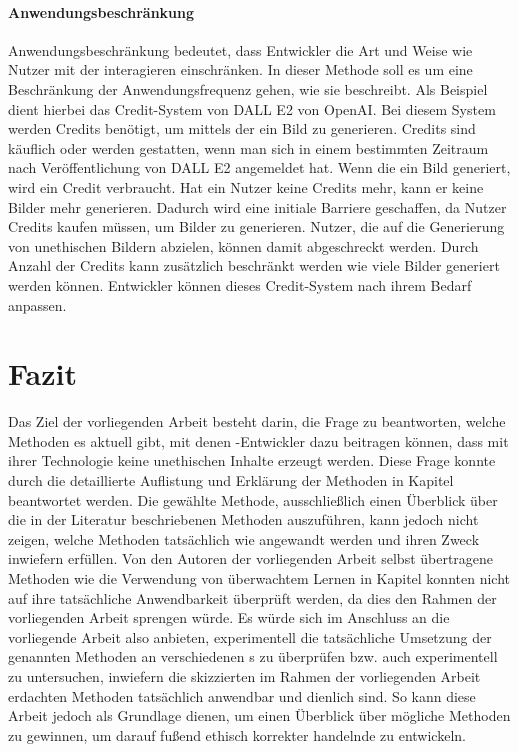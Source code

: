 \documentclass[12pt]{report}
\begin{document}
\subsubsection{Anwendungsbeschränkung} %
Anwendungsbeschränkung bedeutet, dass Entwickler die Art und Weise wie Nutzer mit der  interagieren einschränken. In dieser Methode soll es um eine Beschränkung der Anwendungsfrequenz gehen, wie sie \cite{Jang} beschreibt. Als Beispiel dient hierbei das Credit-System von DALL E2 von OpenAI. Bei diesem System werden Credits benötigt, um mittels der  ein Bild zu generieren. Credits sind käuflich oder werden gestatten, wenn man sich in einem bestimmten Zeitraum nach Veröffentlichung von DALL E2 angemeldet hat. Wenn die  ein Bild generiert, wird ein Credit verbraucht. Hat ein Nutzer keine Credits mehr, kann er keine Bilder mehr generieren. Dadurch wird eine initiale Barriere geschaffen, da Nutzer Credits kaufen müssen, um Bilder zu generieren. Nutzer, die auf die Generierung von unethischen Bildern abzielen, können damit abgeschreckt werden. Durch Anzahl der Credits kann zusätzlich beschränkt werden wie viele Bilder generiert werden können. Entwickler können dieses Credit-System nach ihrem Bedarf anpassen.


\chapter{Fazit}
Das Ziel der vorliegenden Arbeit besteht darin, die Frage zu beantworten, welche Methoden es aktuell gibt, mit denen -Entwickler dazu beitragen können, dass mit ihrer Technologie keine unethischen Inhalte erzeugt werden. Diese Frage konnte durch die detaillierte Auflistung und Erklärung der Methoden in Kapitel  beantwortet werden. Die gewählte Methode, ausschließlich einen Überblick über die in der Literatur beschriebenen Methoden auszuführen, kann jedoch nicht zeigen, welche Methoden tatsächlich wie angewandt werden und ihren Zweck inwiefern erfüllen. Von den Autoren der vorliegenden Arbeit selbst übertragene Methoden wie die Verwendung von überwachtem Lernen in Kapitel  konnten nicht auf ihre tatsächliche Anwendbarkeit überprüft werden, da dies den Rahmen der vorliegenden Arbeit sprengen würde. Es würde sich im Anschluss an die vorliegende Arbeit also anbieten, experimentell die tatsächliche Umsetzung der genannten Methoden an verschiedenen s zu überprüfen bzw. auch experimentell zu untersuchen, inwiefern die skizzierten im Rahmen der vorliegenden Arbeit erdachten Methoden tatsächlich anwendbar und dienlich sind.
So kann diese Arbeit jedoch als Grundlage dienen, um einen Überblick über mögliche Methoden zu gewinnen, um darauf fußend ethisch korrekter handelnde  zu entwickeln.
\end{document}
